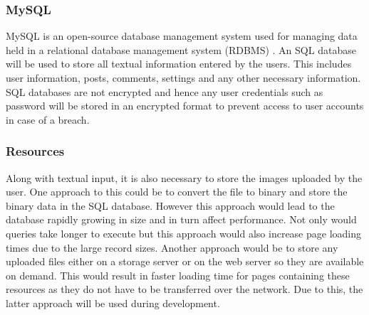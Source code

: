 \subsubsection{MySQL} 
MySQL is an open-source database management system used for managing data held in a relational database management system (RDBMS) \cite{MySQL:Home}. An SQL database will be used to store all textual information entered by the users. This includes user information, posts, comments, settings and any other necessary information. SQL databases are not encrypted and hence any user credentials such as password will be stored in an encrypted format to prevent access to user accounts in case of a breach.

\subsubsection{Resources}
Along with textual input, it is also necessary to store the images uploaded by the user. One approach to this could be to convert the file to binary and store the binary data in the SQL database. However this approach would lead to the database rapidly growing in size and in turn affect performance. Not only would queries take longer to execute but this approach would also increase page loading times due to the large record sizes. Another approach would be to store any uploaded files either on a storage server or on the web server so they are available on demand. This would result in faster loading time for pages containing these resources as they do not have to be transferred over the network. Due to this, the latter approach will be used during development.